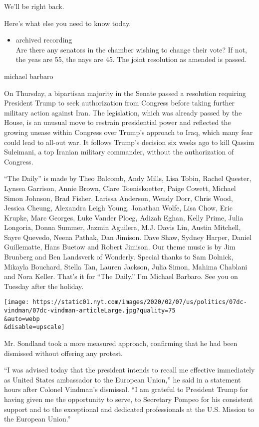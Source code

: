 We'll be right back.

Here's what else you need to know today.

\begin{itemize}
\tightlist
\item
  archived recording\\
  Are there any senators in the chamber wishing to change their vote? If
  not, the yeas are 55, the nays are 45. The joint resolution as amended
  is passed.
\end{itemize}

michael barbaro

On Thursday, a bipartisan majority in the Senate passed a resolution
requiring President Trump to seek authorization from Congress before
taking further military action against Iran. The legislation, which was
already passed by the House, is an unusual move to restrain presidential
power and reflected the growing unease within Congress over Trump's
approach to Iraq, which many fear could lead to all-out war. It follows
Trump's decision six weeks ago to kill Qassim Suleimani, a top Iranian
military commander, without the authorization of Congress.

``The Daily'' is made by Theo Balcomb, Andy Mills, Lisa Tobin, Rachel
Quester, Lynsea Garrison, Annie Brown, Clare Toeniskoetter, Paige
Cowett, Michael Simon Johnson, Brad Fisher, Larissa Anderson, Wendy
Dorr, Chris Wood, Jessica Cheung, Alexandra Leigh Young, Jonathan Wolfe,
Lisa Chow, Eric Krupke, Marc Georges, Luke Vander Ploeg, Adizah Eghan,
Kelly Prime, Julia Longoria, Donna Summer, Jazmin Aguilera, M.J. Davis
Lin, Austin Mitchell, Sayre Quevedo, Neena Pathak, Dan Jimison. Dave
Shaw, Sydney Harper, Daniel Guillematte, Hans Buetow and Robert Jimison.
Our theme music is by Jim Brunberg and Ben Landsverk of Wonderly.
Special thanks to Sam Dolnick, Mikayla Bouchard, Stella Tan, Lauren
Jackson, Julia Simon, Mahima Chablani and Nora Keller. That's it for
``The Daily.'' I'm Michael Barbaro. See you on Tuesday after the
holiday.

\texttt{[image: https://static01.nyt.com/images/2020/02/07/us/politics/07dc-vindman/07dc-vindman-articleLarge.jpg?quality=75\\\&auto=webp\\\&disable=upscale]}

Mr. Sondland took a more measured approach, confirming that he had been
dismissed without offering any protest.

``I was advised today that the president intends to recall me effective
immediately as United States ambassador to the European Union,'' he said
in a statement hours after Colonel Vindman's dismissal. ``I am grateful
to President Trump for having given me the opportunity to serve, to
Secretary Pompeo for his consistent support and to the exceptional and
dedicated professionals at the U.S. Mission to the European Union.''


